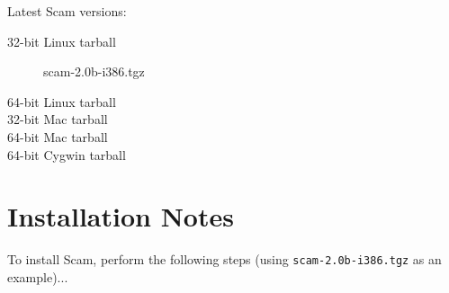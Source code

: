 \documentclass{article}
\begin{document}
Latest Scam versions:

\begin{description}
    \item[32-bit Linux tarball]
         {scam-2.0b-i386.tgz}
    \item[64-bit Linux tarball]
    \item[32-bit Mac tarball]
    \item[64-bit Mac tarball]
    \item[64-bit Cygwin tarball]
\end{description}

%
%


\section*{Installation Notes}

To install Scam, perform the following steps
(using {\tt scam-2.0b-i386.tgz} as an example)...
\end{document}

